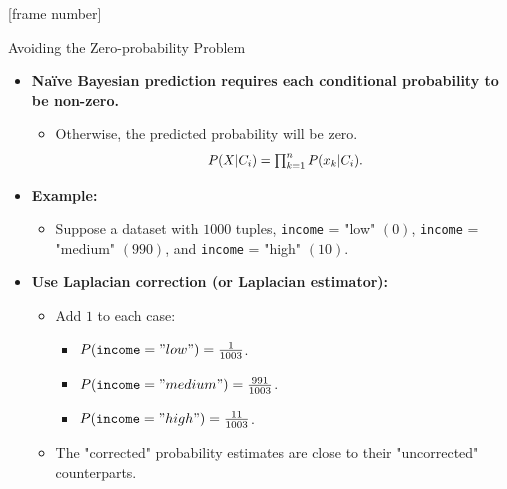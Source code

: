 \documentclass[aspectratio=169,t,table]{beamer}
\begin{document}
  {
    [frame number]
    \begin{frame}{Avoiding the Zero-probability Problem}
      \begin{itemize}
        \item \textbf{Naïve Bayesian prediction requires each conditional probability to be non-zero.}
        \begin{itemize}
          \item Otherwise, the predicted probability will be zero.
          \begin{align}
            \resizebox{4cm}{!}{
            $P(X|C_i) = \prod_{k=1}^{n} P(x_k|C_i).$}
          \end{align}
        \end{itemize}
        \item \textbf{Example:}
        \begin{itemize}
          \item Suppose a dataset with $1000$ tuples, \texttt{income} = "low" $(0)$, \texttt{income} = "medium" $(990)$, and \texttt{income} = "high" $(10)$.
        \end{itemize}
        \item \textbf{Use {\color{airforceblue}Laplacian correction} (or Laplacian estimator):}
        \begin{itemize}
          \item Add $1$ to each case:
          \begin{itemize}
            \item $P(\texttt{income} = "low") = \frac{1}{1003}$.
            \item $P(\texttt{income} = "medium") = \frac{991}{1003}$.
            \item $P(\texttt{income} = "high") = \frac{11}{1003}$.
          \end{itemize}
          \item The "corrected" probability estimates are close to their "uncorrected" counterparts.
        \end{itemize}
      \end{itemize}
    \end{frame}
  }
\end{document}
